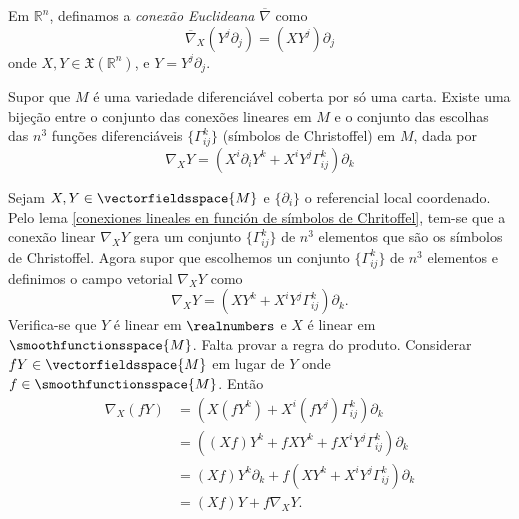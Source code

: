 
\begin{definicao}
	Em $\mathbb{R}^n$, definamos a \emph{conexão Euclideana} $\overline{\nabla}$ como
	\begin{equation*}
		\overline{\nabla}_X \left( Y^j \partial_j \right) = (X Y^j) \partial_j
	\end{equation*}
	onde $X,Y \in \mathfrak{X}(\mathbb{R}^n)$, e $Y = Y^j \partial_j$.
\end{definicao}

\begin{lema}\label{bijecao-entre-a-escolha-dos-simbolos-de-christoffel-e-as-conexoes-lineares}
	Supor que $M$ é uma variedade diferenciável coberta por só uma carta. Existe uma bijeção entre o conjunto das conexões lineares em $M$ e o conjunto das escolhas das $n^3$ funções diferenciáveis $\{ \Gamma^k_{ij} \}$ (símbolos de Christoffel) em $M$, dada por
	\begin{equation*}
		\nabla_X Y = \left( X^i \partial_i Y^k + X^i Y^j \Gamma^k_{ij} \right) \partial_k
	\end{equation*}
\end{lema}

\begin{demonstracao}
	Sejam $X,Y \in \vectorfieldsspace{M}$ e $\{ \partial_i \}$ o referencial local coordenado. Pelo lema \ref{conexiones lineales en función de símbolos de Chritoffel}, tem-se que a conexão linear $\nabla_X Y$ gera um conjunto $\{ \Gamma_{ij}^k \}$ de $n^3$ elementos que são os símbolos de Christoffel. Agora supor que escolhemos un conjunto $\{ \Gamma_{ij}^k \} $ de $n^3$ elementos e definimos o campo vetorial $\nabla_X Y$ como
	\begin{equation*}
		\nabla_X Y = (X Y^k + X^i Y^j \Gamma_{ij}^k) \partial_k.
	\end{equation*}
	Verifica-se que $Y$ é linear em $\realnumbers$ e $X$ é linear em $\smoothfunctionsspace{M}$. Falta provar a regra do produto. Considerar $fY \in \vectorfieldsspace{M}$ em lugar de $Y$ onde $f \in \smoothfunctionsspace{M}$. Então
	\begin{align*}
		\nabla_X (fY) &= (X(f Y^k) + X^i (f Y^j) \Gamma_{ij}^k) \partial_k\\
		&= ( (Xf) Y^k + f X Y^k + f X^i Y^j \Gamma_{ij}^k ) \partial_k\\
		&= (Xf) Y^k \partial_k + f (X Y^k + X^i Y^j \Gamma_{ij}^k) \partial_k\\
		&= (Xf) Y + f \nabla_X Y.
	\end{align*}
\end{demonstracao}

